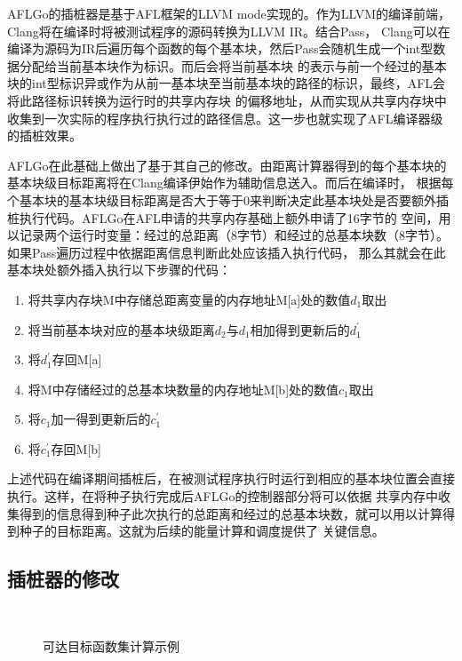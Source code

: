\documentclass[bachelor]{njupthesis}
\begin{document}
AFLGo的插桩器是基于AFL框架的LLVM mode实现的。作为LLVM的编译前端，Clang将在编译时将被测试程序的源码转换为LLVM IR。结合Pass，
Clang可以在编译为源码为IR后遍历每个函数的每个基本块，然后Pass会随机生成一个int型数据分配给当前基本块作为标识。而后会将当前基本块
的表示与前一个经过的基本块的int型标识异或作为从前一基本块至当前基本块的路径的标识，最终，AFL会将此路径标识转换为运行时的共享内存块
的偏移地址，从而实现从共享内存块中收集到一次实际的程序执行执行过的路径信息。这一步也就实现了AFL编译器级的插桩效果。

AFLGo在此基础上做出了基于其自己的修改。由距离计算器得到的每个基本块的基本块级目标距离将在Clang编译伊始作为辅助信息送入。而后在编译时，
根据每个基本块的基本块级目标距离是否大于等于0来判断决定此基本块处是否要额外插桩执行代码。AFLGo在AFL申请的共享内存基础上额外申请了16字节的
空间，用以记录两个运行时变量：经过的总距离（8字节）和经过的总基本块数（8字节）。如果Pass遍历过程中依据距离信息判断此处应该插入执行代码，
那么其就会在此基本块处额外插入执行以下步骤的代码：
\begin{enumerate}[label=(\arabic*)]
	\item 将共享内存块M中存储总距离变量的内存地址M[a]处的数值$d_1$取出
	\item 将当前基本块对应的基本块级距离$d_2$与$d_1$相加得到更新后的$d_1^\prime$
	\item 将$d_1^\prime$存回M[a]
	\item 将M中存储经过的总基本块数量的内存地址M[b]处的数值$c_1$取出
	\item 将$c_1$加一得到更新后的$c_1^\prime$ 
	\item 将$c_1^\prime$存回M[b] 
\end{enumerate}

上述代码在编译期间插桩后，在被测试程序执行时运行到相应的基本块位置会直接执行。这样，在将种子执行完成后AFLGo的控制器部分将可以依据
共享内存中收集得到的信息得到种子此次执行的总距离和经过的总基本块数，就可以用以计算得到种子的目标距离。这就为后续的能量计算和调度提供了
关键信息。
\subsection{插桩器的修改}
\begin{figure}[htb]
	\\
	\caption{可达目标函数集计算示例}
 	\label{pic:fc}
\end{figure}
\end{document}
